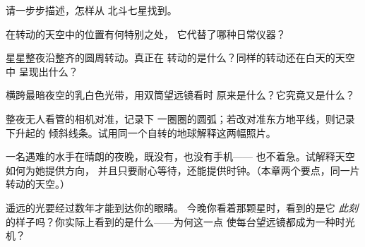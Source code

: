 \begin{exercise}[$\star$]\label{exo:g5:stars-night-sky:5}
请一步步描述，怎样从
北斗七星找到。
\end{exercise}

\begin{exercise}[$\star$]\label{exo:g5:stars-night-sky:6}
在转动的天空中的位置有何特别之处，
它代替了哪种日常仪器？
\end{exercise}

\begin{exercise}[$\star$]\label{exo:g5:stars-night-sky:7}
星星整夜沿整齐的圆周转动。真正在
转动的是什么？同样的转动还在白天的天空中
呈现出什么？
\end{exercise}

\begin{exercise}[$\star$]\label{exo:g5:stars-night-sky:8}
横跨最暗夜空的乳白色光带，用双筒望远镜看时
原来是什么？它究竟又是什么？
\end{exercise}

\begin{exercise}[$\star\star$]\label{exo:g5:stars-night-sky:9}
整夜无人看管的相机对准，记录下
一圈圈的圆弧；若改对准东方地平线，则记录下升起的
倾斜线条。试用同一个自转的地球解释这两幅照片。
\end{exercise}

\begin{exercise}[$\star\star$]\label{exo:g5:stars-night-sky:10}
一名遇难的水手在晴朗的夜晚，既没有，也没有手机——
也不着急。试解释天空如何为她提供方向，
并且只要耐心等待，还能提供时钟。（本章两个要点，同一片转动的天空。）
\end{exercise}

\begin{exercise}[$\star\star$]\label{exo:g5:stars-night-sky:11}
遥远的光要经过数年才能到达你的眼睛。
今晚你看着那颗星时，看到的是它
\emph{此刻}的样子吗？你实际上看到的是什么——为何这一点
使每台望远镜都成为一种时光机？
\end{exercise}
